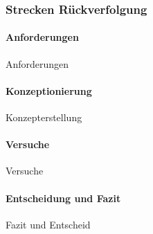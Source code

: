 \documentclass[main.tex]{subfiles} %
\begin{document}

\subsubsection{Strecken Rückverfolgung}

\paragraph{Anforderungen}
Anforderungen

\paragraph{Konzeptionierung}
Konzepterstellung

\paragraph{Versuche}
Versuche

\paragraph{Entscheidung und Fazit}
Fazit und Entscheid
\end{document}
